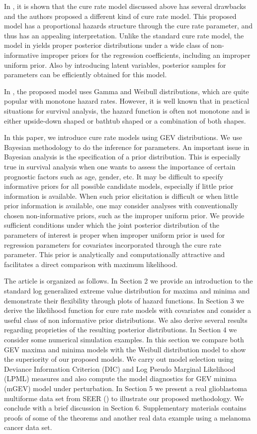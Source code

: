 \documentclass[smallextended]{svjour3}       %
\begin{document}
In \citet{chen:ibra:sinh:1999}, it is shown that the cure rate
model discussed above has several drawbacks and the authors proposed a different kind of cure
rate model. This proposed model has a proportional hazards structure
through the cure rate parameter, and thus has an appealing
interpretation. Unlike the standard cure rate
model, the model in \citet{chen:ibra:sinh:1999} yields proper posterior distributions under
a wide class of non-informative improper priors for the regression
coefficients, including an improper uniform prior. Also
by introducing latent variables, posterior samples for parameters can
be efficiently obtained for this model.


In \citet{chen:ibra:sinh:1999}, the proposed model uses Gamma and
Weibull distributions, which are quite popular with monotone hazard
rates. However, it is well known that in practical situations for survival
analysis, the hazard function is often not monotone and is either
upside-down shaped or bathtub shaped or a combination of both shapes.


In this paper, we introduce cure rate models using GEV distributions. 
We use Bayesian methodology to do the inference for
parameters. An important issue in Bayesian analysis is the specification
of a prior distribution. This is especially true in survival analysis
when one wants to assess the importance of certain prognostic factors
such as age, gender, etc. It may be difficult to specify informative
priors for all possible candidate models, especially if little prior
information is available. When such prior elicitation is difficult
or when little prior information is available, one may consider analyses
with conventionally chosen non-informative priors, such as the improper uniform prior.
We provide sufficient conditions
under which the joint posterior distribution of the parameters of interest
is proper when improper uniform prior is used for regression parameters
for covariates incorporated through the cure rate parameter. This
prior is analytically and computationally attractive and facilitates
a direct comparison with maximum likelihood.


The article is organized as follows. In Section 2 we provide an
introduction to the standard log generalized extreme value distribution
for maxima and minima and demonstrate their flexibility through plots of hazard functions. In Section 3 we derive the likelihood function for cure rate models 
with covariates and consider a useful class of non informative prior distributions.
We also derive several results regarding
proprieties of the resulting posterior distributions. In Section 4
we consider some numerical simulation examples. In this section
we compare both GEV maxima and minima models with the Weibull distribution model to show
the superiority of our proposed models. We carry out model selection using Deviance
Information Criterion (DIC) and Log Pseudo Marginal Likelihood (LPML) measures and also
compute the model diagnostics for GEV minima (mGEV) model under perturbation.
In Section 5 we present a real glioblastoma multiforme data set from SEER (\citet{seer:database:2013}) to illustrate our proposed methodology. We conclude with a brief discussion in Section 6. Supplementary materials contains proofs of some of the theorems and another real data example using a melanoma cancer data set.
\end{document}
